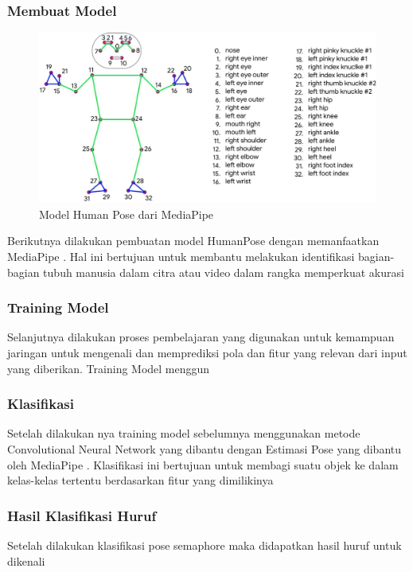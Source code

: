 \subsubsection{Membuat Model}
\begin{figure} [ht] \centering
  \includegraphics[scale=0.15]{gambar/humanpose.jpg}
  \caption{Model Human Pose dari MediaPipe}
  \label{fig:Blueprint}
\end{figure}
Berikutnya dilakukan pembuatan model HumanPose dengan memanfaatkan MediaPipe . Hal ini bertujuan untuk membantu melakukan identifikasi bagian-bagian tubuh manusia dalam citra atau video dalam rangka memperkuat akurasi 

\subsubsection{Training Model}
Selanjutnya dilakukan proses pembelajaran yang digunakan untuk  kemampuan jaringan untuk mengenali dan memprediksi pola dan fitur yang relevan dari input yang diberikan. Training Model menggun

\subsubsection{Klasifikasi}
Setelah dilakukan nya training model sebelumnya menggunakan metode Convolutional Neural Network yang dibantu dengan Estimasi Pose yang dibantu oleh MediaPipe . Klasifikasi ini bertujuan untuk membagi suatu objek ke dalam kelas-kelas tertentu berdasarkan fitur yang dimilikinya

\subsubsection{Hasil Klasifikasi Huruf}
Setelah dilakukan klasifikasi pose semaphore maka didapatkan hasil huruf untuk dikenali

